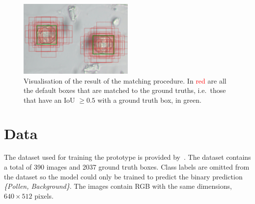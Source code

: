 \begin{figure}[htb]
  \centering
  \includegraphics[width=0.5\textwidth]{figs/priors_matching}
  \caption[Default box matching]{Visualisation of the result of the matching procedure.
In \textcolor{red}{red} are all the default boxes that are matched to the ground truths, i.e.~those that have an IoU \( \geq 0.5 \) with a ground truth box, in \textcolor{nicegreen}{green}.}\label{fig:priors}
\end{figure}


\section*{Data}
The dataset used for training the prototype is provided by~\cite{gallardo_caballero_precise_2019}.
The dataset contains a total of 390 images and 2037 ground truth boxes.
Class labels are omitted from the dataset so the model could only be trained to predict the binary prediction \textit{\{Pollen, Background\}}.
The images contain RGB with the same dimensions, \( 640\times 512 \) pixels.

